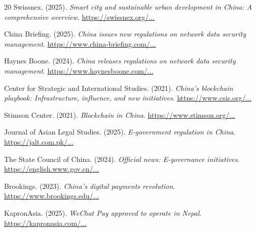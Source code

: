 \documentclass[12pt,a4paper]{article}
\begin{document}
\begin{thebibliography}{20}
Swissnex. (2025). \textit{Smart city and sustainable urban development in China: A comprehensive overview}. 
\href{https://swissnex.org/china/news/smart-city-and-sustainable-urban-development-in-china-a-comprehensive-overview/}{https://swissnex.org/...}

China Briefing. (2025). \textit{China issues new regulations on network data security management}. 
\href{https://www.china-briefing.com/news/china-issues-new-regulations-on-network-data-security-management-effective-january-1-2025/}{https://www.china-briefing.com/...}

Haynes Boone. (2024). \textit{China releases regulations on network data security management}. 
\href{https://www.haynesboone.com/~/media/Project/HaynesBoone/HaynesBoone/PDFs/Alert%20PDFs/2024/China%20Update%2038%20%20China%20Releases%20Regulations%20on%20Network%20Data%20Security%20Management}{https://www.haynesboone.com/...}

Center for Strategic and International Studies. (2021). \textit{China’s blockchain playbook: Infrastructure, influence, and new initiatives}. 
\href{https://www.csis.org/blogs/strategic-technologies-blog/chinas-blockchain-playbook-infrastructure-influence-and-new}{https://www.csis.org/...}

Stimson Center. (2021). \textit{Blockchain in China}. 
\href{https://www.stimson.org/2021/blockchain-in-china/}{https://www.stimson.org/...}

Journal of Asian Legal Studies. (2025). \textit{E-government regulation in China}. 
\href{https://jalt.com.pk/index.php/jalt/article/view/621}{https://jalt.com.pk/...}

The State Council of China. (2024). \textit{Official news: E-governance initiatives}. 
\href{https://english.www.gov.cn/news/202403/02/content_WS65e26742c6d0868f4e8e4881.html}{https://english.www.gov.cn/...}

Brookings. (2023). \textit{China’s digital payments revolution}. 
\href{https://www.brookings.edu/articles/chinas-digital-payments-revolution/}{https://www.brookings.edu/...}

KapronAsia. (2025). \textit{WeChat Pay approved to operate in Nepal}. 
\href{https://kapronasia.com/insight/blogs/payments-research/china-payments-research/wechat-pay-approved-to-operate-in-nepal}{https://kapronasia.com/...}


\end{thebibliography}
\end{document}
